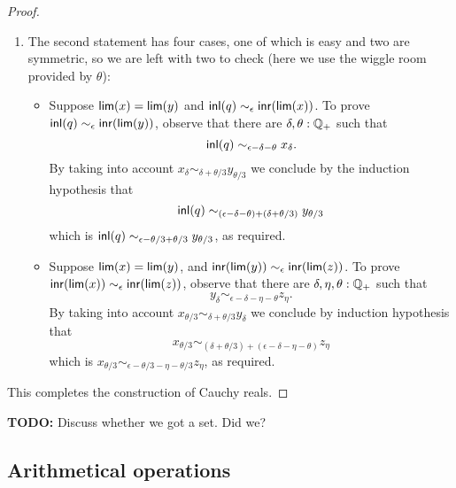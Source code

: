 \begin{proof}
\begin{enumerate}
\begin{itemize}
    \end{itemize}
  \item The second statement has four cases, one of which is easy and two are symmetric,
    so we are left with two to check (here we use the wiggle room provided by $\theta$):
    \begin{itemize}
    \item Suppose $\mathsf{lim}(x) = \mathsf{lim}(y)$ and $\mathsf{inl}(q) \sim_\epsilon \mathsf{inr}(\mathsf{lim}(x))$. To
      prove $\mathsf{inl}(q) \sim_\epsilon \mathsf{inr}(\mathsf{lim}(y))$, observe that there are $\delta,
      \theta : \mathbb{Q}_{+}$ such that
      \begin{equation*}
        \mathsf{inl}(q) \sim_{\epsilon - \delta - \theta} x_\delta.
      \end{equation*}
      By taking into account $x_\delta \sim_{\delta + \theta/3} y_{\theta/3}$ we conclude
      by the induction hypothesis that      
      \begin{equation*}
        \mathsf{inl}(q) \sim_{(\epsilon - \delta - \theta) + (\delta + \theta/3)} y_{\theta/3}
      \end{equation*}
      which is $\mathsf{inl}(q) \sim_{\epsilon - \theta/3 + \theta/3} y_{\theta/3}$, as required.
    \item Suppose $\mathsf{lim}(x) = \mathsf{lim}(y)$, and $\mathsf{inr}(\mathsf{lim}(y)) \sim_\epsilon
      \mathsf{inr}(\mathsf{lim}(z))$. To prove $\mathsf{inr}(\mathsf{lim}(x)) \sim_\epsilon \mathsf{inr}(\mathsf{lim}(z))$, observe
      that there are $\delta, \eta, \theta : \mathbb{Q}_{+}$ such that
      \begin{equation*}
        y_\delta \sim_{\epsilon - \delta - \eta - \theta} z_\eta.
      \end{equation*}
      By taking into account $x_{\theta/3} \sim_{\delta + \theta/3} y_\delta$ we conclude
      by induction hypothesis that
      \begin{equation*}
        x_{\theta/3} \sim_{(\delta + \theta/3) + (\epsilon - \delta - \eta - \theta)} z_\eta
      \end{equation*}
      which is $x_{\theta/3} \sim_{\epsilon - \theta/3 - \eta - \theta/3} z_\eta$, as
      required.
    \end{itemize}
  \end{enumerate}
  This completes the construction of Cauchy reals.
\end{proof}

\textbf{TODO:} Discuss whether we got a set. Did we?

\subsection{Arithmetical operations}
\label{sec:arithm-oper}





